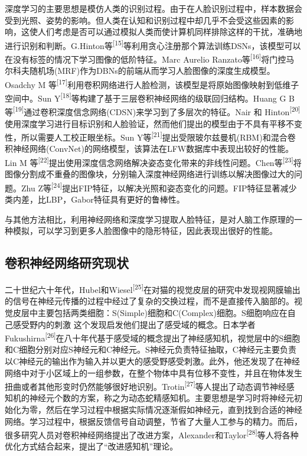 \documentclass[bachelor,zhspacing]{cqu}  %
\begin{document}
深度学习的主要思想是模仿人类的识别过程。由于在人脸识别过程中，样本数据会受到光照、姿势的影响。但人类在认知和识别过程中却几乎不会受这些因素的影响，这使人们考虑是否可以通过模拟人类而使计算机同样排除这样的干扰，准确地进行识别和判断。G.Hinton等\textsuperscript{{[}15{]}}等利用贪心注册那个算法训练DSNs，该模型可以在没有标签的情况下学习图像的低阶特征。Marc
Aurelio
Ranzato等\textsuperscript{{[}16{]}}将门控马尔科夫随机场(MRF)作为DBNs的前端从而学习人脸图像的深度生成模型。Osadchy
M
等\textsuperscript{{[}17{]}}利用卷积网络进行人脸检测，该模型是将原始图像映射到低维子空间中。Sun
Y\textsuperscript{{[}18{]}}等构建了基于三层卷积神经网络的级联回归结构。Huang
G B
等\textsuperscript{{[}19{]}}通过卷积深度信念网络(CDSN)来学习到了多层次的特征。Nair
和
Hinton\textsuperscript{{[}20{]}}使用深度学习进行目标识别和人脸验证，然而他们提出的模型由于不具有平移不变性，所以需要人工校正眼坐标。Sun
Y等\textsuperscript{{[}21{]}}提出受限玻尔兹曼机(RBM)和混合卷积神经网络(ConvNet)的网络模型，该算法在LFW数据库中表现出较好的性能。Lin
M
等\textsuperscript{{[}22{]}}提出使用深度信念网络解决姿态变化带来的非线性问题。Chen等\textsuperscript{{[}23{]}}将图像分割成不重叠的图像块，分别输入深度神经网络进行训练以解决图像过大的问题。Zhu
Z等\textsuperscript{{[}24{]}}提出FIP特征，以解决光照和姿态变化的问题。FIP特征显著减少类内差，比LBP，Gabor特征具有更好的鲁棒性。

与其他方法相比，利用神经网络和深度学习提取人脸特征，是对人脑工作原理的一种模拟，可以学习到更多人脸图像中的隐形特征，因此表现出很好的性能。

\subsection{卷积神经网络研究现状}\label{ux5377ux79efux795eux7ecfux7f51ux7edcux7814ux7a76ux73b0ux72b6}

二十世纪六十年代，Hubel和Wiesel\textsuperscript{{[}25{]}}在对猫的视觉皮层的研究中发现视网膜输出的信号在神经元传播的过程中经过了复杂的交换过程，而不是直接传入脑部的。视觉皮层中主要包括两类细胞：S(Simple)细胞和C(Complex)细胞。S细胞响应在自己感受野内的刺激
这个发现启发他们提出了感受域的概念。日本学者Fukushirna\textsuperscript{{[}26{]}}在八十年代基于感受域的概念提出了神经感知机，视觉层中的S细胞和C细胞分别对应S神经元和C神经元。S神经元负责特征抽取，C神经元主要负责以C神经元的输出作为输入并以更大的感受野感受刺激。此外，他还发现了在神经网络中对于小区域上的一组参数，在整个物体中具有位移不变性，并且在物体发生扭曲或者其他形变时仍然能够很好地识别。Trotin\textsuperscript{{[}27{]}}等人提出了动态调节神经感知机的神经元个数的方案，称之为动态蛇精感知机。主要思想是学习时将神经元初始化为零，然后在学习过程中根据实际情况逐渐假如神经元，直到找到合适的神经网络。学习过程中，根据反馈信号自动调整，节省了大量人工参与的精力。而后，很多研究人员对卷积神经网络提出了改进方案，Alexander和Taylor\textsuperscript{{[}28{]}}等人将各种优化方式结合起来，提出了``改进感知机''理论。
\end{document}
